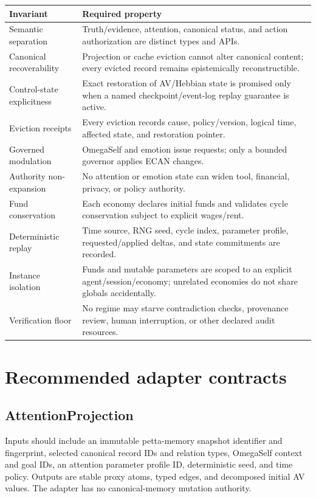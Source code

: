 \documentclass[11pt]{article}
\begin{document}
\begin{longtable}{p{}p{}}
\toprule
\textbf{Invariant} & \textbf{Required property} \\
\midrule
\endhead
Semantic separation & Truth/evidence, attention, canonical status, and action
authorization are distinct types and APIs. \\
Canonical recoverability & Projection or cache eviction cannot alter canonical
content; every evicted record remains epistemically reconstructible. \\
Control-state explicitness & Exact restoration of AV/Hebbian state is promised
only when a named checkpoint/event-log replay guarantee is active. \\
Eviction receipts & Every eviction records cause, policy/version, logical time,
affected state, and restoration pointer. \\
Governed modulation & OmegaSelf and emotion issue requests; only a bounded
governor applies ECAN changes. \\
Authority non-expansion & No attention or emotion state can widen tool,
financial, privacy, or policy authority. \\
Fund conservation & Each economy declares initial funds and validates cycle
conservation subject to explicit wages/rent. \\
Deterministic replay & Time source, RNG seed, cycle index, parameter profile,
requested/applied deltas, and state commitments are recorded. \\
Instance isolation & Funds and mutable parameters are scoped to an explicit
agent/session/economy; unrelated economies do not share globals accidentally. \\
Verification floor & No regime may starve contradiction checks, provenance
review, human interruption, or other declared audit resources. \\
\bottomrule
\end{longtable}

\section{Recommended adapter contracts}

\subsection{AttentionProjection}

Inputs should include an immutable petta-memory snapshot identifier and
fingerprint, selected canonical record IDs and relation types, OmegaSelf context
and goal IDs, an attention parameter profile ID, deterministic seed, and time
policy.  Outputs are stable proxy atoms, typed edges, and decomposed initial AV
values.  The adapter has no canonical-memory mutation authority.
\end{document}
